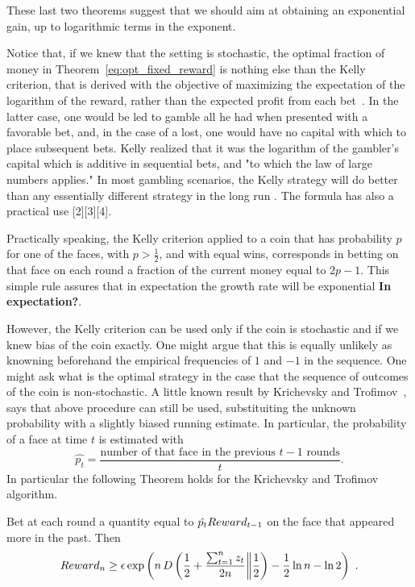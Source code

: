 These last two theorems suggest that we should aim at obtaining an exponential gain, up to logarithmic terms in the exponent.

Notice that, if we knew that the setting is stochastic, the optimal fraction of money in Theorem~\ref{eq:opt_fixed_reward} is nothing else than the Kelly criterion, that is derived with the objective of maximizing the expectation of the logarithm of the reward, rather than the expected profit from each bet~\citep{Kelly56}.
In the latter case, one would be led to gamble all he had when presented with a favorable bet, and, in the case of a lost, one would have no capital with which to place subsequent bets. Kelly realized that it was the logarithm of the gambler's capital which is additive in sequential bets, and "to which the law of large numbers applies."
In most gambling scenarios, the Kelly strategy will do better than any essentially different strategy in the long run \cite{}. The formula has also a practical use [2][3][4].

Practically speaking, the Kelly criterion applied to a coin that has probability $p$ for one of the faces, with $p> \frac{1}{2}$, and with equal wins, corresponds in betting on that face on each round a fraction of the current money equal to $2p-1$. This simple rule assures that in expectation the growth rate will be exponential \textbf{In expectation?}.

However, the Kelly criterion can be used only if the coin is stochastic and if we knew bias of the coin exactly. One might argue that this is equally unlikely as knowning beforehand the empirical frequencies of $1$ and $-1$ in the sequence.
One might ask what is the optimal strategy in the case that the sequence of outcomes of the coin is non-stochastic.
A little known result by Krichevsky and Trofimov~\cite{}, says that above procedure can still be used, substituiting the  unknown probability with a slightly biased running estimate. In particular, the probability of a face at time $t$ is estimated with 
\[
\hat{p_t}=\frac{\text{number of that face in the previous } t-1 \text{ rounds}}{t}.
\]
In particular the following Theorem holds for the Krichevsky and Trofimov algorithm.
\begin{theorem}
Bet at each round a quantity equal to $\hat{p_t} Reward_{t-1}$ on the face that appeared more in the past. Then
\begin{align*}
Reward_{n} 
\geq \epsilon \exp\left(n\, D\left(\frac{1}{2}+\frac{\sum_{t=1}^n z_t}{2 n}\middle\|\frac{1}{2}\right) - \frac{1}{2} \ln n - \ln 2\right)~.
\end{align*}
\end{theorem}

